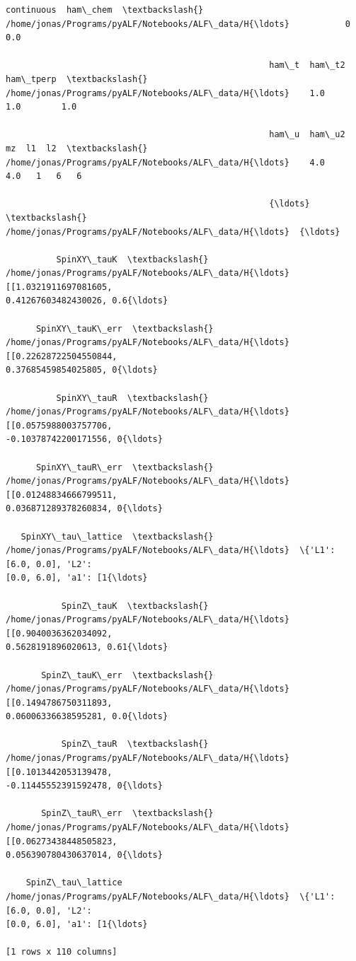 \documentclass[11pt]{article}
\makeatletter
\newcommand{\boxspacing}{\kern\kvtcb@left@rule\kern\kvtcb@boxsep}
\newcommand{\prompt}[4]{
        {\ttfamily\llap{{\color{#2}[#3]:\hspace{3pt}#4}}\vspace{-\baselineskip}}
    }
\makeatother
\begin{document}
            \begin{tcolorbox}[breakable, size=fbox, boxrule=.5pt, pad at break*=1mm, opacityfill=0]
\prompt{Out}{outcolor}{8}{\boxspacing}
\begin{Verbatim}[commandchars=\\\{\}]
                                                    continuous  ham\_chem  \textbackslash{}
/home/jonas/Programs/pyALF/Notebooks/ALF\_data/H{\ldots}           0       0.0

                                                    ham\_t  ham\_t2  ham\_tperp  \textbackslash{}
/home/jonas/Programs/pyALF/Notebooks/ALF\_data/H{\ldots}    1.0     1.0        1.0

                                                    ham\_u  ham\_u2  mz  l1  l2  \textbackslash{}
/home/jonas/Programs/pyALF/Notebooks/ALF\_data/H{\ldots}    4.0     4.0   1   6   6

                                                    {\ldots}  \textbackslash{}
/home/jonas/Programs/pyALF/Notebooks/ALF\_data/H{\ldots}  {\ldots}

          SpinXY\_tauK  \textbackslash{}
/home/jonas/Programs/pyALF/Notebooks/ALF\_data/H{\ldots}  [[1.0321911697081605,
0.41267603482430026, 0.6{\ldots}

      SpinXY\_tauK\_err  \textbackslash{}
/home/jonas/Programs/pyALF/Notebooks/ALF\_data/H{\ldots}  [[0.22628722504550844,
0.37685459854025805, 0{\ldots}

          SpinXY\_tauR  \textbackslash{}
/home/jonas/Programs/pyALF/Notebooks/ALF\_data/H{\ldots}  [[0.0575988003757706,
-0.10378742200171556, 0{\ldots}

      SpinXY\_tauR\_err  \textbackslash{}
/home/jonas/Programs/pyALF/Notebooks/ALF\_data/H{\ldots}  [[0.01248834666799511,
0.036871289378260834, 0{\ldots}

   SpinXY\_tau\_lattice  \textbackslash{}
/home/jonas/Programs/pyALF/Notebooks/ALF\_data/H{\ldots}  \{'L1': [6.0, 0.0], 'L2':
[0.0, 6.0], 'a1': [1{\ldots}

           SpinZ\_tauK  \textbackslash{}
/home/jonas/Programs/pyALF/Notebooks/ALF\_data/H{\ldots}  [[0.9040036362034092,
0.5628191896020613, 0.61{\ldots}

       SpinZ\_tauK\_err  \textbackslash{}
/home/jonas/Programs/pyALF/Notebooks/ALF\_data/H{\ldots}  [[0.1494786750311893,
0.06006336638595281, 0.0{\ldots}

           SpinZ\_tauR  \textbackslash{}
/home/jonas/Programs/pyALF/Notebooks/ALF\_data/H{\ldots}  [[0.1013442053139478,
-0.11445552391592478, 0{\ldots}

       SpinZ\_tauR\_err  \textbackslash{}
/home/jonas/Programs/pyALF/Notebooks/ALF\_data/H{\ldots}  [[0.06273438448505823,
0.056390780430637014, 0{\ldots}

    SpinZ\_tau\_lattice
/home/jonas/Programs/pyALF/Notebooks/ALF\_data/H{\ldots}  \{'L1': [6.0, 0.0], 'L2':
[0.0, 6.0], 'a1': [1{\ldots}

[1 rows x 110 columns]
\end{Verbatim}
\end{tcolorbox}
        
\end{document}
